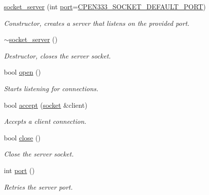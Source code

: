 \begin{DoxyCompactItemize}
\item 
\hyperlink{classcpen333_1_1process_1_1windows_1_1socket__server_a99931d4663b36d1205c6497b995203bc}{socket\+\_\+server} (int \hyperlink{classcpen333_1_1process_1_1windows_1_1socket__server_a4b5f9231c046f947a77a6458202c2712}{port}=\hyperlink{impl_2windows_2socket_8h_a5164d95d122c5161aceda0d59b962e2e}{C\+P\+E\+N333\+\_\+\+S\+O\+C\+K\+E\+T\+\_\+\+D\+E\+F\+A\+U\+L\+T\+\_\+\+P\+O\+RT})
\begin{DoxyCompactList}\small\item\em Constructor, creates a server that listens on the provided port. \end{DoxyCompactList}\item 
\mbox{\label{classcpen333_1_1process_1_1windows_1_1socket__server_a83cf30c312cacb0bbabb2c14b32fff88}} 
\hyperlink{classcpen333_1_1process_1_1windows_1_1socket__server_a83cf30c312cacb0bbabb2c14b32fff88}{$\sim$socket\+\_\+server} ()
\begin{DoxyCompactList}\small\item\em Destructor, closes the server socket. \end{DoxyCompactList}\item 
bool \hyperlink{classcpen333_1_1process_1_1windows_1_1socket__server_a440013d371c8c49edcf0e845545d3c1d}{open} ()
\begin{DoxyCompactList}\small\item\em Starts listening for connections. \end{DoxyCompactList}\item 
bool \hyperlink{classcpen333_1_1process_1_1windows_1_1socket__server_a9faaa8159f63116a3fa5e7a68ca8095a}{accept} (\hyperlink{classcpen333_1_1process_1_1windows_1_1socket}{socket} \&client)
\begin{DoxyCompactList}\small\item\em Accepts a client connection. \end{DoxyCompactList}\item 
bool \hyperlink{classcpen333_1_1process_1_1windows_1_1socket__server_a5eddf38d7b08e27f2299a750f16eae66}{close} ()
\begin{DoxyCompactList}\small\item\em Close the server socket. \end{DoxyCompactList}\item 
int \hyperlink{classcpen333_1_1process_1_1windows_1_1socket__server_a4b5f9231c046f947a77a6458202c2712}{port} ()
\begin{DoxyCompactList}\small\item\em Retries the server port. \end{DoxyCompactList}\end{DoxyCompactItemize}
